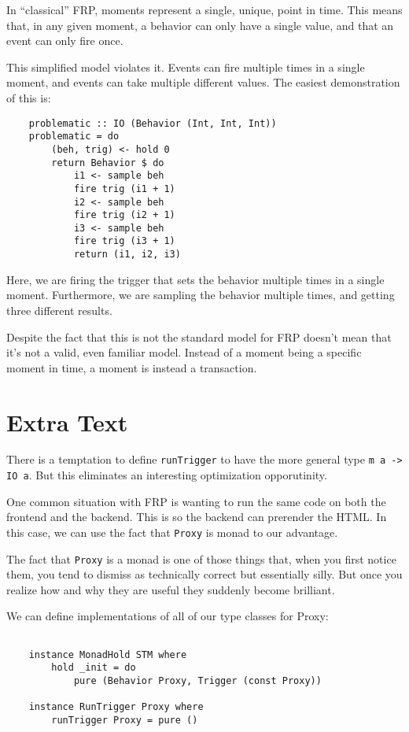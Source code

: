 \documentclass{article}
\begin{document}
In ``classical'' FRP, moments represent a single, unique, point in time.
This means that, in any given moment, a behavior can only have a single
value, and that an event can only fire once.

This simplified model violates it.  Events can fire multiple times in a
single moment, and events can take multiple different values.  The
easiest demonstration of this is:

\begin{verbatim}
    problematic :: IO (Behavior (Int, Int, Int))
    problematic = do
        (beh, trig) <- hold 0
        return Behavior $ do
            i1 <- sample beh
            fire trig (i1 + 1)
            i2 <- sample beh
            fire trig (i2 + 1)
            i3 <- sample beh
            fire trig (i3 + 1)
            return (i1, i2, i3)
\end{verbatim}

Here, we are firing the trigger that sets the behavior multiple times in
a single moment.  Furthermore, we are sampling the behavior multiple
times, and getting three different results.

Despite the fact that this is not the standard model for FRP doesn't
mean that it's not a valid, even familiar model.  Instead of a moment
being a specific moment in time, a moment is instead a transaction.


\section{Extra Text}

There is a temptation to define \verb|runTrigger| to have the more
general type \verb|m a -> IO a|.  But this eliminates an interesting
optimization opporutinity.

One common situation with FRP is wanting to run the same code on both
the frontend and the backend.  This is so the backend can prerender
the HTML.  In this case, we can use the fact that \verb|Proxy| is monad
to our advantage.  

The fact that \verb|Proxy| is a monad is one of those things that, when
you first notice them, you tend to dismiss as technically correct but
essentially silly.  But once you realize how and why they are useful
they suddenly become brilliant.

We can define implementations of all of our type classes for Proxy:

\begin{verbatim}

    instance MonadHold STM where
        hold _init = do
            pure (Behavior Proxy, Trigger (const Proxy))

    instance RunTrigger Proxy where
        runTrigger Proxy = pure ()

\end{verbatim}
\end{document}
